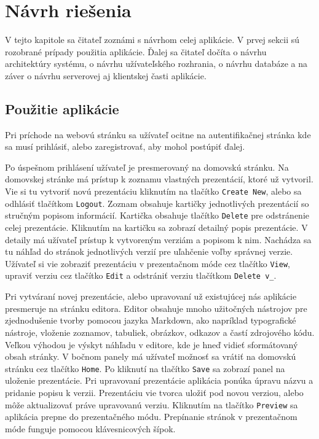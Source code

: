 \chapter{Návrh riešenia}
\label{kapitola4}
V tejto kapitole sa čitateľ zoznámi s návrhom celej aplikácie. V prvej sekcii sú rozobrané prípady použitia aplikácie. Ďalej sa čitateľ dočíta o návrhu architektúry systému, o návrhu užívateľského rozhrania, o návrhu databáze a na záver o návrhu serverovej aj klientskej časti aplikácie.

\section{Použitie aplikácie}
\label{pouzitie}
Pri príchode na webovú stránku sa užívateľ ocitne na autentifikačnej stránka kde sa musí prihlásiť, alebo zaregistrovať, aby mohol postúpiť ďalej.

Po úspešnom prihlásení užívateľ je presmerovaný na domovskú stránku. Na domovskej stránke má prístup k zoznamu vlastných prezentácií, ktoré už vytvoril. Vie si tu vytvoriť novú prezentáciu kliknutím na tlačítko \texttt{Create New}, alebo sa odhlásiť tlačítkom \texttt{Logout}. Zoznam obsahuje kartičky jednotlivých prezentácií so stručným popisom informácií. Kartička obsahuje tlačítko \texttt{Delete} pre odstránenie celej prezentácie. Kliknutím na kartičku sa zobrazí detailný popis prezentácie. V detaily má užívateľ prístup k vytvoreným verziám a popisom k nim. Nachádza sa tu náhľad do stránok jednotlivých verzií pre uľahčenie voľby správnej verzie. Užívateľ si vie zobraziť prezentáciu v prezentačnom móde cez tlačítko \texttt{View}, upraviť verziu cez tlačítko \texttt{Edit} a odstrániť verziu tlačítkom \texttt{Delete v\_}.

Pri vytváraní novej prezentácie, alebo upravovaní už existujúcej nás aplikácie presmeruje na stránku editora. Editor obsahuje mnoho užitočných nástrojov pre zjednodušenie tvorby pomocou jazyka Markdown, ako napríklad typografické nástroje, vloženie zoznamov, tabuliek, obrázkov, odkazov a častí zdrojového kódu. Veľkou výhodou je výskyt náhľadu v editore, kde je hneď vidieť sformátovaný obsah stránky. V bočnom panely má užívateľ možnosť sa vrátiť na domovskú stránku cez tlačítko \texttt{Home}. Po kliknutí na tlačítko \texttt{Save} sa zobrazí panel na uloženie prezentácie. Pri upravovaní prezentácie aplikácia ponúka úpravu názvu a pridanie popisu k verzii. Prezentáciu vie tvorca uložiť pod novou verziou, alebo môže aktualizovať práve upravovanú verziu. Kliknutím na tlačítko \texttt{Preview} sa aplikácia prepne do prezentačného módu. Prepínanie stránok v prezentačnom móde funguje pomocou klávesnicových šípok. 

